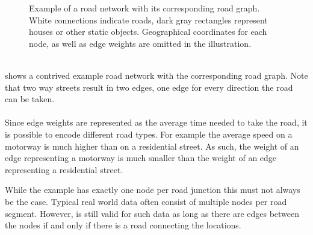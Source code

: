 \begin{figure}[!ht]
\begin{center}
		\end{center}
		\caption{Example of a road network with its corresponding road graph. White connections indicate roads,
			dark gray rectangles represent houses or other static objects.
			Geographical coordinates for each node, as well as edge weights are omitted in the illustration.}
		\label{roadGraphExample}
	\end{figure}\quad\\
	 shows a contrived example road network with the corresponding road graph.
	Note that two way streets result in two edges, one edge for every direction the road can be taken.\\\\
	Since edge weights are represented as the average time needed to take the road, it is possible to encode different road types.
	For example the average speed on a motorway is much higher than on a residential street. As such, the weight of an edge
	representing a motorway is much smaller than the weight of an edge representing a residential street.
	
	While the example has exactly one node per road junction this must not always be the case. Typical real world data often consist
	of multiple nodes per road segment. However,  is still valid for such data as long as there are edges
	between the nodes if and only if there is a road connecting the locations.

